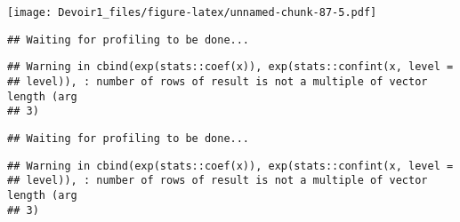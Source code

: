 \documentclass[]{article}
\newenvironment{Shaded}{\begin{snugshade}}{\end{snugshade}}
\newcommand{\KeywordTok}[1]{\textcolor[rgb]{0.13,0.29,0.53}{\textbf{#1}}}
\newcommand{\DataTypeTok}[1]{\textcolor[rgb]{0.13,0.29,0.53}{#1}}
\newcommand{\DecValTok}[1]{\textcolor[rgb]{0.00,0.00,0.81}{#1}}
\newcommand{\StringTok}[1]{\textcolor[rgb]{0.31,0.60,0.02}{#1}}
\newcommand{\OperatorTok}[1]{\textcolor[rgb]{0.81,0.36,0.00}{\textbf{#1}}}
\newcommand{\NormalTok}[1]{#1}
\begin{document}
\texttt{[image: Devoir1\_files/figure-latex/unnamed-chunk-87-5.pdf]}

\begin{Shaded}
\end{Shaded}

\begin{verbatim}
## Waiting for profiling to be done...
\end{verbatim}

\begin{verbatim}
## Warning in cbind(exp(stats::coef(x)), exp(stats::confint(x, level =
## level)), : number of rows of result is not a multiple of vector length (arg
## 3)
\end{verbatim}

\begin{verbatim}
## Waiting for profiling to be done...
\end{verbatim}

\begin{verbatim}
## Warning in cbind(exp(stats::coef(x)), exp(stats::confint(x, level =
## level)), : number of rows of result is not a multiple of vector length (arg
## 3)
\end{verbatim}
\end{document}
